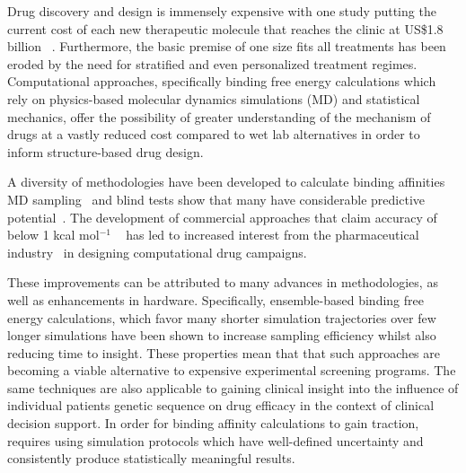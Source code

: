 
Drug discovery and design is immensely expensive with one study putting the current 
cost of each new therapeutic molecule that reaches the clinic at US\$1.8 billion 
~\cite{Paul2010}.
Furthermore, the basic premise of one size fits all treatments has been eroded by the 
need for stratified and even personalized treatment regimes.
Computational approaches, specifically binding free energy calculations which 
rely on physics-based molecular dynamics simulations (MD) and statistical 
mechanics, offer the possibility of greater understanding of the mechanism of 
drugs at a vastly reduced cost compared to wet lab alternatives in order to 
inform structure-based drug design. 



A diversity of methodologies have been developed to calculate binding affinities
MD sampling~\cite{Mobley2012} and blind tests show that many have considerable
predictive potential~\cite{Mey2017, Yin2017}.
The development of commercial approaches that claim accuracy of below 1 
kcal mol$^{-1}$ ~\cite{Wang2015} has led to increased interest from the 
pharmaceutical industry~\cite{Ganesan2017} in designing computational drug 
campaigns. 


These improvements can be attributed to many advances in methodologies, as well 
as enhancements in hardware. 
Specifically, ensemble-based binding free energy calculations, which favor many 
shorter simulation trajectories over few longer simulations have been shown to 
increase sampling efficiency whilst also reducing time to insight.
These properties mean that that such approaches are becoming a viable alternative 
to expensive experimental screening programs. 
The same techniques are also applicable to gaining clinical insight into the 
influence of individual patients genetic sequence on drug efficacy in the context 
of clinical decision support. 
In order for binding affinity calculations to gain traction, requires using 
simulation protocols which have well-defined uncertainty and consistently 
produce statistically meaningful results.

